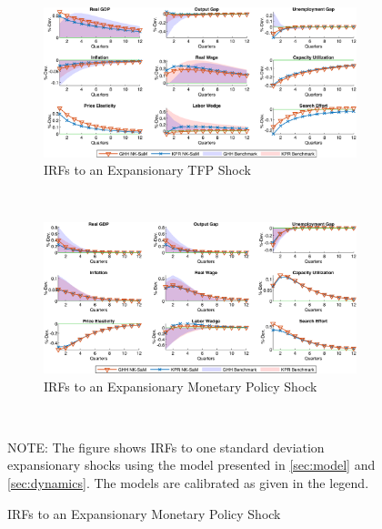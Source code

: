 \documentclass[12pt,3p,authoryear,review]{elsarticle}
\begin{document}
\begin{figure}[h!]%
    \centering%
    \caption{Using GHH Preferences - IRFs to Expansionary TFP and Demand Shocks}\label{fig:app_irf_robust_ghh_1}%
    \begin{subfigure}{\textwidth}%
        \centering%
        \caption{IRFs to an Expansionary TFP Shock}%
        \includegraphics[width=\textwidth]{fig_24_irf_robust_ghh_tfp.png}%
    \end{subfigure}\\%
	\vspace{0.2in}%
    \begin{subfigure}{\textwidth}%
        \centering%
        \caption{IRFs to an Expansionary Monetary Policy Shock}%
        \includegraphics[width=\textwidth]{fig_25_irf_robust_ghh_policy.png}%
    \end{subfigure}\\%
    {\tiny \singlespacing NOTE: The figure shows IRFs to one standard deviation expansionary shocks using the model presented in \cref{sec:model} and \cref{sec:dynamics}. The models are calibrated as given in the legend.\par}%
\end{figure}%
\end{document}
